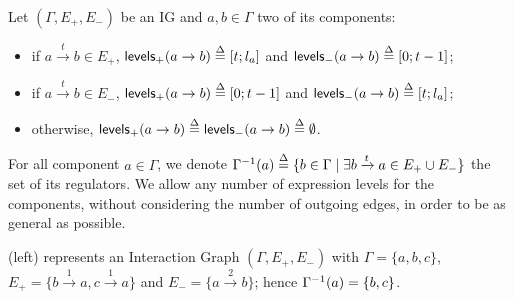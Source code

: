 \begin{definition}\label{def:levels}
Let $(\Gamma,E_+,E_-)$ be an IG and $a, b \in \Gamma$ two of its components:
\begin{itemize}
  \item if $a \xrightarrow{t} b \in E_+$, $\mathsf{levels}_+(a\rightarrow b) \stackrel{\Delta}= [t; l_a]$ and
    $\mathsf{levels}_-(a\rightarrow b) \stackrel{\Delta}= [0; t-1]$;
  \item if $a \xrightarrow{t} b \in E_-$, $\mathsf{levels}_+(a\rightarrow b) \stackrel{\Delta}= [0; t-1]$ and
    $\mathsf{levels}_-(a\rightarrow b) \stackrel{\Delta}= [t; l_a]$;
  \item otherwise, $\mathsf{levels}_+(a\rightarrow b) \stackrel{\Delta}= \mathsf{levels}_-(a\rightarrow b) \stackrel{\Delta}= \emptyset$.
\end{itemize}
\end{definition}

For all component $a \in \Gamma$, we denote
$\Gamma^{-1}(a) \stackrel{\Delta}= \{ b\in\Gamma\mid \exists b\xrightarrow t a\in E_+\cup E_- \}$
the set of its regulators.
We allow any number of expression levels for the components, without considering the number of outgoing edges, in order to be as general as possible.

\begin{example*}
(left) represents an Interaction Graph $(\Gamma,E_+,E_-)$ with
$\Gamma = \{a, b, c\}$,
$E_+ = \{b \xrightarrow{1} a, c \xrightarrow{1} a\}$ and
$E_- = \{a \xrightarrow{2} b\}$;
hence $\Gamma^{-1}(a) = \{b, c\}$.
\end{example*}

